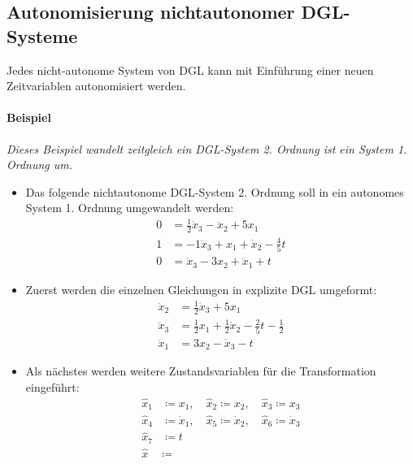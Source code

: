 		\subsection{Autonomisierung nichtautonomer DGL-Systeme} %
			Jedes nicht-autonome System von DGL kann mit Einführung einer neuen Zeitvariablen autonomisiert werden.

			\paragraph{Beispiel}
				\textit{Dieses Beispiel wandelt zeitgleich ein DGL-System 2. Ordnung ist ein System 1. Ordnung um.}

				\begin{itemize}
					\item Das folgende nichtautonome DGL-System 2. Ordnung soll in ein autonomes System 1. Ordnung umgewandelt werden:
						\begin{align*}
							0 & = \frac{1}{2} \dot{x} _ 3 - \ddot{x} _ 2 + 5 x _ 1      \\
							1 & = -1 \ddot{x} _ 3 + x _ 1 + \dot{x} _ 2 - \frac{4}{5} t \\
							0 & = \dot{x} _ 3 - 3 x _ 2 + \ddot{x} _ 1 + t
						\end{align*}
					\item Zuerst werden die einzelnen Gleichungen in explizite DGL umgeformt:
						\begin{align*}
							\ddot{x} _ 2 & = \frac{1}{2} \dot{x} _ 3 + 5 x _ 1                                         \\
							\ddot{x} _ 3 & = \frac{1}{2} x _ 1 + \frac{1}{2} \dot{x} _ 2 - \frac{2}{5} t - \frac{1}{2} \\
							\ddot{x} _ 1 & = 3 x _ 2 - \dot{x} _ 3 - t
						\end{align*}
					\item Als nächstes werden weitere Zustandsvariablen für die Transformation eingeführt:
						\begin{align*}
							\hat{x} _ 1 & \coloneqq x _ 1, \quad \hat{x} _ 2 \coloneqq x _ 2, \quad \hat{x} _ 3 \coloneqq x _ 3                   \\
							\hat{x} _ 4 & \coloneqq \dot{x} _ 1, \quad \hat{x} _ 5 \coloneqq \dot{x} _ 2, \quad \hat{x} _ 6 \coloneqq \dot{x} _ 3 \\
							\hat{x} _ 7 & \coloneqq t \tag{Autonomisierung}                                                                       \\
							\hat{x}     & \coloneqq

\end{align*}
\end{itemize}

